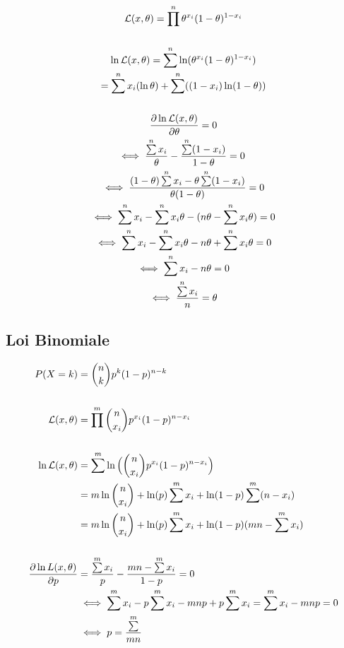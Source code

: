 \documentclass{article}
\begin{document}
\begin{gather*}
    \likelihood(x, \theta) = \prod\limits^n \theta^{x_i}(1 - \theta)^{1 - x_i} \\ \\
    \ln \likelihood(x, \theta) = \sum\limits^n \ln(\theta^{x_i}(1 - \theta)^{1 - x_i}) \\
    = \sum\limits^n x_i (\ln\theta) + \sum\limits^n ((1-x_i) \ln(1-\theta)) \\ \\
    \frac{\partial \ln \likelihood(x, \theta)}{\partial \theta} = 0 \\
    \iff \frac{\sum\limits^n x_i}{\theta} - \frac{\sum\limits^n (1-x_i)}{1 - \theta} = 0 \\
    \iff \frac{(1 - \theta) \sum\limits^n x_i - \theta \sum\limits^n (1 - x_i)}{\theta (1 - \theta)} = 0 \\
    \iff \sum\limits^n x_i - \sum\limits^n x_i \theta - (n\theta - \sum\limits^n x_i\theta) = 0 \\
    \iff \sum\limits^n x_i - \sum\limits^n x_i \theta -  n\theta + \sum\limits^n x_i\theta  = 0 \\
    \iff \sum\limits^n x_i - n\theta = 0 \\
    \iff \frac{\sum\limits^n x_i}{n} = \theta
\end{gather*}

\subsection{Loi Binomiale}

\begin{align*}
    P(X=k) &= \dbinom{n}{k}p^k(1-p)^{n-k} \\
    \\
    {\cal L}(x, \theta) &= \prod\limits^m \dbinom{n}{x_i}p^{x_i}(1-p)^{n-x_i} \\
    \\
    \ln {\cal L}(x, \theta) &= \sum\limits^m \ln \Big( \dbinom{n}{x_i}p^{x_i}(1-p)^{n-x_i} \Big) \\
    &= m \ln \dbinom{n}{x_i} + \ln(p) \sum\limits^m x_i + \ln(1-p)\sum\limits^m(n-x_i) \\
    &= m \ln \dbinom{n}{x_i} + \ln(p) \sum\limits^m x_i + \ln(1-p)(mn - \sum\limits^m x_i) \\
    \\
    \frac{\partial \ln L(x, \theta)}{\partial p} &= \frac{\sum\limits^m x_i}{p} - \frac{mn - \sum\limits^m x_i}{1 - p} = 0 \\
    &\iff \sum\limits^m x_i - p \sum\limits^m x_i - mnp + p \sum\limits^m x_i = \sum\limits^m x_i - mnp = 0 \\
    &\iff p = \frac{\sum\limits^m}{mn}
\end{align*}
\end{document}

